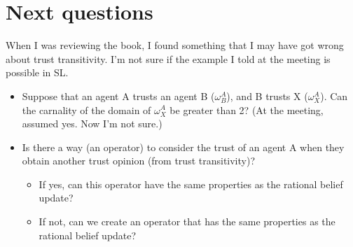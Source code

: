 \documentclass[a4paper,12pt]{article}
\theoremstyle{definition}
\numberwithin{equation}{section}
\begin{document}
\section{Next questions}

When I was reviewing the book, I found something that I may have got wrong about trust transitivity. I'm not sure if the example I told at the meeting is possible in SL.

\begin{itemize}
	\item Suppose that an agent A trusts an agent B ($\omega^A_B$), and B trusts X ($\omega^A_X$). Can the carnality of the domain of $\omega^A_X$ be greater than 2? (At the meeting, assumed yes. Now I'm not sure.)
	
	\item Is there a way (an operator) to consider the trust of an agent A when they obtain another trust opinion (from trust transitivity)?
	
	\begin{itemize}
		\item If yes, can this operator have the same properties as the rational belief update?
		
		\item If not, can we create an operator that has the same properties as the rational belief update?
	\end{itemize}
\end{itemize}


%
%
\end{document}
